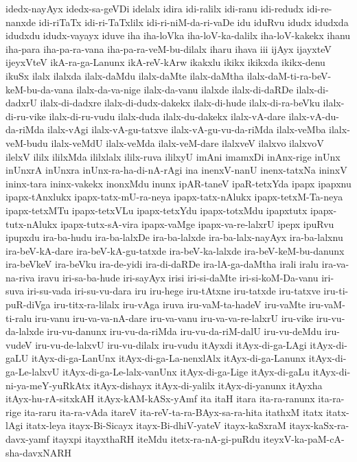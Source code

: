 {idedx-nayAyx
idedx-sa-geVDi
idelalx
idira
idi-ralilx
idi-ranu
idi-redudx
idi-re-nanxde
idi-riTaTx
idi-ri-TaTxlilx
idi-ri-niM-da-ri-vaDe
idu
iduRvu
idudx
idudxda
idudxdu
idudx-vayayx
iduve
iha
iha-loVka
iha-loV-ka-dalilx
iha-loV-kakekx
ihanu
iha-para
iha-pa-ra-vana
iha-pa-ra-veM-bu-dilalx
iharu
ihava
iii
ijAyx
ijayxteV
ijeyxVteV
ikA-ra-ga-Lanunx
ikA-reV-kArw
ikakxlu
ikikx
ikikxda
ikikx-denu
ikuSx
ilalx
ilalxda
ilalx-daMdu
ilalx-daMte
ilalx-daMtha
ilalx-daM-ti-ra-beV-keM-bu-da-vana
ilalx-da-va-nige
ilalx-da-vanu
ilalxde
ilalx-di-daRDe
ilalx-di-dadxrU
ilalx-di-dadxre
ilalx-di-dudx-dakekx
ilalx-di-hude
ilalx-di-ra-beVku
ilalx-di-ru-vike
ilalx-di-ru-vudu
ilalx-duda
ilalx-du-dakekx
ilalx-vA-dare
ilalx-vA-du-da-riMda
ilalx-vAgi
ilalx-vA-gu-tatxve
ilalx-vA-gu-vu-da-riMda
ilalx-veMba
ilalx-veM-budu
ilalx-veMdU
ilalx-veMda
ilalx-veM-dare
ilalxveV
ilalxvo
ilalxvoV
ilelxV
ililx
ililxMda
ililxlalx
ililx-ruva
ililxyU
imAni
imamxDi
inAnx-rige
inUnx
inUnxrA
inUnxra
inUnx-ra-ha-di-nA-rAgi
ina
inenxV-nanU
inenx-tatxNa
ininxV
ininx-tara
ininx-vakekx
inonxMdu
inunx
ipAR-taneV
ipaR-tetxYda
ipapx
ipapxnu
ipapx-tAnxlukx
ipapx-tatx-mU-ra-neya
ipapx-tatx-nAlukx
ipapx-tetxM-Ta-neya
ipapx-tetxMTu
ipapx-tetxVLu
ipapx-tetxYdu
ipapx-totxMdu
ipapxtutx
ipapx-tutx-nAlukx
ipapx-tutx-sA-vira
ipapx-vaMge
ipapx-va-re-lalxrU
ipepx
ipuRvu
ipupxdu
ira-ba-hudu
ira-ba-lalxDe
ira-ba-lalxde
ira-ba-lalx-nayAyx
ira-ba-lalxnu
ira-beV-kA-dare
ira-beV-kA-gu-tatxde
ira-beV-ka-lalxde
ira-beV-keM-bu-danunx
ira-beVkeV
ira-beVku
ira-de-yidi
ira-di-daRDe
ira-lA-ga-daMtha
irali
iralu
ira-va-na-riva
iravu
iri-sa-ba-hude
iri-sayAyx
irisi
iri-si-daMte
iri-si-koM-Da-vanu
iri-suva
iri-su-vada
iri-su-vu-dara
iru
iru-hege
iru-tAtxne
iru-tatxde
iru-tatxve
iru-ti-puR-diVga
iru-titx-ra-lilalx
iru-vAga
iruva
iru-vaM-ta-hadeV
iru-vaMte
iru-vaM-ti-ralu
iru-vanu
iru-va-va-nA-dare
iru-va-vanu
iru-va-va-re-lalxrU
iru-vike
iru-vu-da-lalxde
iru-vu-danunx
iru-vu-da-riMda
iru-vu-da-riM-dalU
iru-vu-deMdu
iru-vudeV
iru-vu-de-lalxvU
iru-vu-dilalx
iru-vudu
itAyxdi
itAyx-di-ga-LAgi
itAyx-di-gaLU
itAyx-di-ga-LanUnx
itAyx-di-ga-La-nenxlAlx
itAyx-di-ga-Lanunx
itAyx-di-ga-Le-lalxvU
itAyx-di-ga-Le-lalx-vanUnx
itAyx-di-ga-Lige
itAyx-di-gaLu
itAyx-di-ni-ya-meY-yuRkAtx
itAyx-dishayx
itAyx-di-yalilx
itAyx-di-yanunx
itAyxha
itAyx-hu-rA-sitxkAH
itAyx-kAM-kASx-yAmf
ita
itaH
itara
ita-ra-ranunx
ita-ra-rige
ita-raru
ita-ra-vAda
itareV
ita-reV-ta-ra-BAyx-sa-ra-hita
itathxM
itatx
itatx-lAgi
itatx-leya
itayx-Bi-Sicayx
itayx-Bi-dhiV-yateV
itayx-kaSxraM
itayx-kaSx-ra-davx-yamf
itayxpi
itayxthaRH
iteMdu
itetx-ra-nA-gi-puRdu
iteyxV-ka-paM-cA-sha-davxNARH
}
